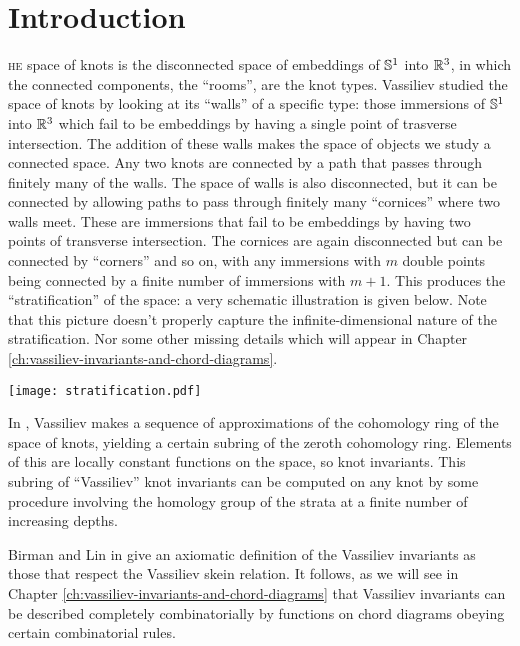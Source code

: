 \chapter*{Introduction}

\lettrine{}{he} space of knots is the disconnected space of embeddings of \(\S^{1}\) into \(\R^{3}\), in which the connected components, the ``rooms'', are the knot types. Vassiliev studied the space of knots by looking at its ``walls'' of a specific type: those immersions of \(\S^{1}\) into \(\R^{3}\) which fail to be embeddings by having a single point of trasverse intersection. The addition of these walls makes the space of objects we study a connected space. Any two knots are connected by a path that passes through finitely many of the walls. The space of walls is also disconnected, but it can be connected by allowing paths to pass through finitely many ``cornices'' where two walls meet. These are immersions that fail to be embeddings by having two points of transverse intersection. The cornices are again disconnected but can be connected by ``corners'' and so on, with any immersions with \(m\) double points being connected by a finite number of immersions with \(m + 1\). This produces the ``stratification'' of the space: a very schematic illustration is given below. Note that this picture doesn't properly capture the infinite-dimensional nature of the stratification. Nor some other missing details which will appear in Chapter \ref{ch:vassiliev-invariants-and-chord-diagrams}.

\begin{center}
	\texttt{[image: stratification.pdf]}
\end{center}

In \cite{cohomology-of-knot-spaces}, Vassiliev makes a sequence of approximations of the cohomology ring of the space of knots, yielding a certain subring of the zeroth cohomology ring. Elements of this are locally constant functions on the space, so knot invariants. This subring of ``Vassiliev'' knot invariants can be computed on any knot by some procedure involving the homology group of the strata at a finite number of increasing depths.

Birman and Lin in \cite{knot-polynomials-and-vassilievs-invariants} give an axiomatic definition of the Vassiliev invariants as those that respect the Vassiliev skein relation. It follows, as we will see in Chapter \ref{ch:vassiliev-invariants-and-chord-diagrams} that Vassiliev invariants can be described completely combinatorially by functions on chord diagrams obeying certain combinatorial rules.

